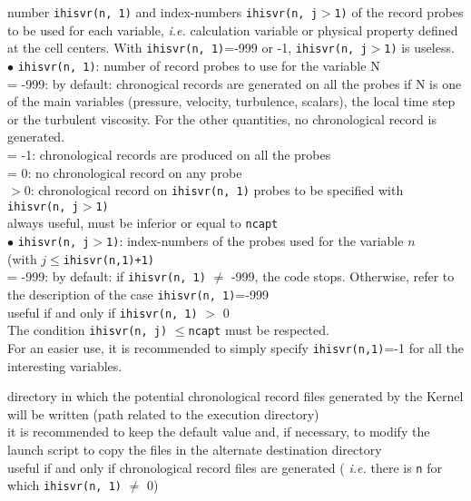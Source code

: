 {number {\tt ihisvr(n, 1)} and index-numbers {\tt ihisvr(n, j$>$1)} of the record
probes to be used for each variable, {\em i.e.} calculation variable
or physical property defined at the cell centers.
With {\tt ihisvr(n, 1)}=-999 or -1, {\tt ihisvr(n, j$>$1)} is useless.\\
\hspace*{.5cm} $\bullet$ {\tt ihisvr(n, 1)}: number of record probes to use
for the variable N\\
\hspace*{1.3cm}= -999: by default: chronogical records are generated on
all the probes if N is one of the main variables (pressure, velocity,
turbulence, scalars), the local time step or the turbulent
viscosity. For the other quantities, no chronological record is generated.\\
\hspace*{1.3cm}= -1: chronological records are produced on all the probes\\
\hspace*{1.3cm}= 0: no chronological record on any probe\\
\hspace*{1.3cm}$>0$: chronological record on {\tt ihisvr(n, 1)} probes to be
specified with  {\tt ihisvr(n, j$>$1)}\\
always useful, must be inferior or equal to {\tt ncapt}\\
\hspace*{.5cm} $\bullet$ {\tt ihisvr(n, j$>$1)}: index-numbers of the probes
used for the variable $n$\\
(with $j \leqslant${\tt ihisvr(n,1)+1)}\\
\hspace*{1.3cm}= -999: by default: if {\tt ihisvr(n, 1)} $\ne$
-999, the  code stops. Otherwise, refer to the description of the case
{\tt ihisvr(n, 1)}=-999\\
useful if and only if {\tt ihisvr(n, 1)} $>$ 0 \\
The condition {\tt ihisvr(n, j)} $\leqslant${\tt ncapt} must be respected.\\
For an easier use, it is recommended to simply specify {\tt ihisvr(n,1)}=-1 for
all the interesting variables.}

{directory in which the potential chronological record files generated by
the Kernel will be written (path related to the execution directory)\\
it is recommended to keep the default value and, if necessary, to modify the
launch script to copy the files in the alternate destination directory\\
useful if and only if chronological record files are generated ({\em
i.e.} there is {\tt n} for which {\tt ihisvr(n, 1)} $\ne$ 0)}

